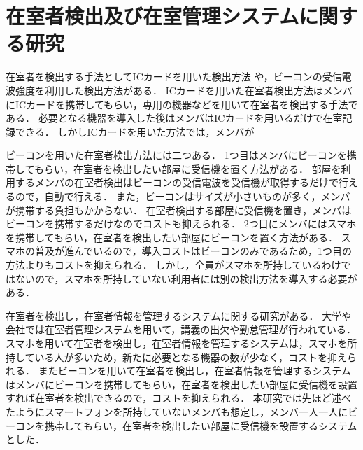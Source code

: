 \section{在室者検出及び在室管理システムに関する研究}\label{2.2}
在室者を検出する手法としてICカードを用いた検出方法
\cite{zyugyou}
\cite{felica}
\cite{densi}
\cite{notouchic}
\cite{felicaweb}
\cite{suica}
や，ビーコンの受信電波強度を利用した検出方法\cite{bledakoku}\cite{blesuitei}がある．
ICカードを用いた在室者検出方法はメンバにICカードを携帯してもらい，専用の機器などを用いて在室者を検出する手法である．
必要となる機器を導入した後はメンバはICカードを用いるだけで在室記録できる．
しかしICカードを用いた方法では，メンバが

ビーコンを用いた在室者検出方法には二つある．
1つ目はメンバにビーコンを携帯してもらい，在室者を検出したい部屋に受信機を置く方法がある．
部屋を利用するメンバの在室者検出はビーコンの受信電波を受信機が取得するだけで行えるので，自動で行える．
また，ビーコンはサイズが小さいものが多く，メンバが携帯する負担もかからない．
在室者検出する部屋に受信機を置き，メンバはビーコンを携帯するだけなのでコストも抑えられる．
2つ目にメンバにはスマホを携帯してもらい，在室者を検出したい部屋にビーコンを置く方法がある．
スマホの普及が進んでいる\cite{hukyu}ので，導入コストはビーコンのみであるため，1つ目の方法よりもコストを抑えられる．
しかし，全員がスマホを所持しているわけではないので，スマホを所持していない利用者には別の検出方法を導入する必要がある．

在室者を検出し，在室者情報を管理するシステムに関する研究がある\cite{smartphoneAndRoom}\cite{laboratory}\cite{prep}．
大学や会社では在室者管理システムを用いて，講義の出欠\cite{smartphone}\cite{nfcandroid}\cite{android}\cite{smartbase}\cite{garake}や勤怠管理\cite{amano}が行われている．
スマホを用いて在室者を検出し，在室者情報を管理するシステムは，スマホを所持している人が多いため，新たに必要となる機器の数が少なく，コストを抑えられる\cite{smartphoneAndRoom}．
またビーコンを用いて在室者を検出し，在室者情報を管理するシステムはメンバにビーコンを携帯してもらい，在室者を検出したい部屋に受信機を設置すれば在室者を検出できるので，コストを抑えられる\cite{laboratory}\cite{prep}．
本研究では先ほど述べたようにスマートフォンを所持していないメンバも想定し，メンバ一人一人にビーコンを携帯してもらい，在室者を検出したい部屋に受信機を設置するシステムとした．


